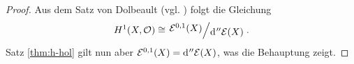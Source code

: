 \begin{proof}
  Aus dem Satz von Dolbeault (vgl. \cite[Satz 15.14]{For}) folgt die
  Gleichung
  \[
  H^1(X, \hol) \cong \quot{\diff^{0,1}(X)}{\d['' \diff(X)]}.
  \]
  Satz \ref{thm:h-hol} gilt nun aber $\diff^{0,1}(X) =
  \d[''\diff(X)]$, was die Behauptung zeigt.
\end{proof}





